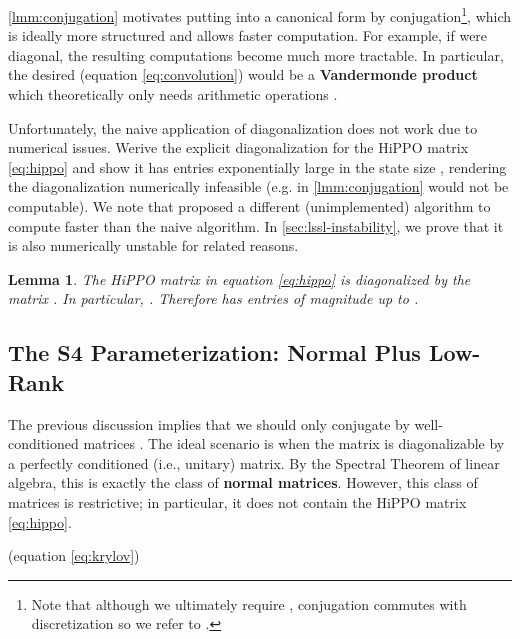 \documentclass{article}
\newtheorem{lemma}{Lemma}[section]
\newcommand{\methodabbrv}{S4}
\begin{document}
\cref{lmm:conjugation} motivates putting  into a canonical form by conjugation\footnote{Note that although we ultimately require , conjugation commutes with discretization so we refer to .}, which is ideally more structured and allows faster computation.
For example, if  were diagonal, the resulting computations become much more tractable.
In particular, the desired  (equation \eqref{eq:convolution}) would be a \textbf{Vandermonde product} which theoretically only needs  arithmetic operations \citep{pan2001structured}.

Unfortunately, the naive application of diagonalization does not work due to numerical issues.
Werive the explicit diagonalization for the HiPPO matrix \eqref{eq:hippo} and show it has entries exponentially large in the state size , rendering the diagonalization numerically infeasible (e.g.  in \cref{lmm:conjugation} would not be computable).
We note that \citet{gu2021lssl} proposed a different (unimplemented) algorithm to compute  faster than the naive algorithm.
In \cref{sec:lssl-instability}, we prove that it is also numerically unstable for related reasons.
\begin{lemma}\label{lmm:hippo-diagonalization}
  The HiPPO matrix  in equation \eqref{eq:hippo} is diagonalized by the matrix .
  In particular, .
  Therefore  has entries of magnitude up to .
\end{lemma}

\subsection{The \methodabbrv{} Parameterization: Normal Plus Low-Rank}
\label{sec:s4-overview}

The previous discussion implies that we should only conjugate by well-conditioned matrices .
The ideal scenario is when the matrix  is diagonalizable by a perfectly conditioned (i.e., unitary) matrix.
By the Spectral Theorem of linear algebra, this is exactly the class of \textbf{normal matrices}.
However, this class of matrices is restrictive; in particular, it does not contain the HiPPO matrix \eqref{eq:hippo}.


\begin{algorithm}[t]
  \caption{\textsc{\methodabbrv{} Convolution Kernel (Sketch)}}\label{alg:s4-convolution}
  \begin{algorithmic}[1]
    \renewcommand{\algorithmicrequire}{\textbf{Input:}}
    \Require{\methodabbrv{} parameters  and step size }
    \renewcommand{\algorithmicensure}{\textbf{Output:}}
     (equation \eqref{eq:krylov})
    \State 
    \State
    
    \label{step:cauchy}
    \State
    
     \State 
    \State 
  \end{algorithmic}
\end{algorithm}
\end{document}
